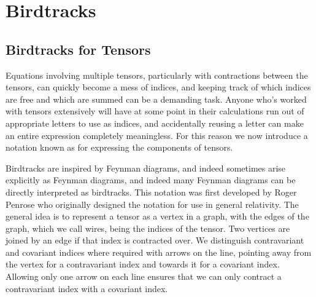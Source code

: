 \documentclass[fleqn]{NotesClass}
\begin{document}
    
    \section{Birdtracks}
    \subsection{Birdtracks for Tensors}
    Equations involving multiple tensors, particularly with contractions between the tensors, can quickly become a mess of indices, and keeping track of which indices are free and which are summed can be a demanding task.
    Anyone who's worked with tensors extensively will have at some point in their calculations run out of appropriate letters to use as indices, and accidentally reusing a letter can make an entire expression completely meaningless.
    For this reason we now introduce a notation known as  for expressing the components of tensors.
    
    Birdtracks are inspired by Feynman diagrams, and indeed sometimes arise explicitly as Feynman diagrams, and indeed many Feynman diagrams can be directly interpreted as birdtracks.
    This notation was first developed by Roger Penrose %
    who originally designed the notation for use in general relativity.
    The general idea is to represent a tensor as a vertex in a graph, with the edges of the graph, which we call wires, being the indices of the tensor.
    Two vertices are joined by an edge if that index is contracted over.
    We distinguish contravariant and covariant indices where required with arrows on the line, pointing away from the vertex for a contravariant index and towards it for a covariant index.
    Allowing only one arrow on each line ensures that we can only contract a contravariant index with a covariant index.
    
\end{document}

